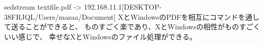 \documentclass{jsarticle}
\begin{document}
\title{}
\author{}
\date{}
\maketitle

   sedstream textfile.pdf -> 192.168.11.1[DESKTOP-38FRJQL/Users/masaa/Document]
  XとWindowsのPDFを相互にコマンドを通して送ることができると、
  ものすごく楽であり、XとWindowsの相性がものすごくいい感じで、
  幸せなXとWindowsのファイル処理ができる。
\end{document}
